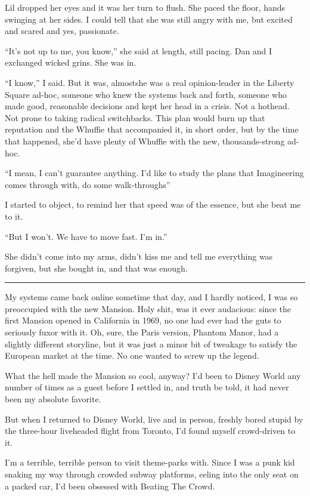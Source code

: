Lil dropped her eyes and it was her turn to flush. She paced the
floor, hands swinging at her sides. I could tell that she was still
angry with me, but excited and scared and yes, passionate.

“It's not up to me, you know,” she said at length, still pacing.
Dan and I exchanged wicked grins. She was in.

“I know,” I said. But it was, almost{\dash}she was a real opinion-leader
in the Liberty Square ad-hoc, someone who knew the systems back and
forth, someone who made good, reasonable decisions and kept her
head in a crisis. Not a hothead. Not prone to taking radical
switchbacks. This plan would burn up that reputation and the
Whuffie that accompanied it, in short order, but by the time that
happened, she'd have plenty of Whuffie with the new,
thousands-strong ad-hoc.

“I mean, I can't guarantee anything. I'd like to study the plans
that Imagineering comes through with, do some walk-throughs{\dash}”

I started to object, to remind her that speed was of the essence,
but she beat me to it.

“But I won't. We have to move fast. I'm in.”

She didn't come into my arms, didn't kiss me and tell me everything
was forgiven, but she bought in, and that was enough.

\begin{center}\rule{3in}{0.4pt}\end{center}

My systems came back online sometime that day, and I hardly
noticed, I was so preoccupied with the new Mansion. Holy shit, was
it ever audacious: since the first Mansion opened in California in
1969, no one had ever had the guts to seriously fuxor with it. Oh,
sure, the Paris version, Phantom Manor, had a slightly different
storyline, but it was just a minor bit of tweakage to satisfy the
European market at the time. No one wanted to screw up the legend.

What the hell made the Mansion so cool, anyway? I'd been to Disney
World any number of times as a guest before I settled in, and truth
be told, it had never been my absolute favorite.

But when I returned to Disney World, live and in person, freshly
bored stupid by the three-hour liveheaded flight from Toronto, I'd
found myself crowd-driven to it.

I'm a terrible, terrible person to visit theme-parks with. Since I
was a punk kid snaking my way through crowded subway platforms,
eeling into the only seat on a packed car, I'd been obsessed with
Beating The Crowd.

